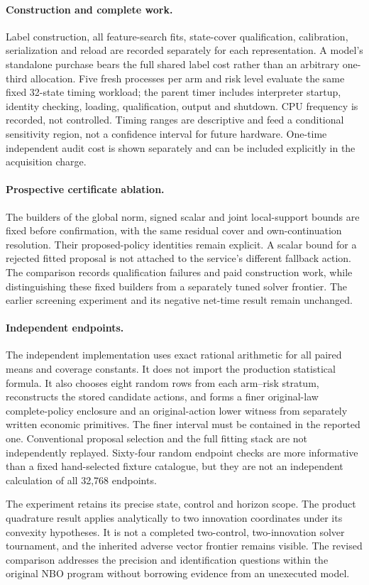 \paragraph{Construction and complete work.}
Label construction, all feature-search fits, state-cover qualification, calibration, serialization and reload are recorded separately for each representation. A model's standalone purchase bears the full shared label cost rather than an arbitrary one-third allocation. Five fresh processes per arm and risk level evaluate the same fixed 32-state timing workload; the parent timer includes interpreter startup, identity checking, loading, qualification, output and shutdown. CPU frequency is recorded, not controlled. Timing ranges are descriptive and feed a conditional sensitivity region, not a confidence interval for future hardware. One-time independent audit cost is shown separately and can be included explicitly in the acquisition charge.

\paragraph{Prospective certificate ablation.}
The builders of the global norm, signed scalar and joint local-support bounds are fixed before confirmation, with the same residual cover and own-continuation resolution. Their proposed-policy identities remain explicit. A scalar bound for a rejected fitted proposal is not attached to the service's different fallback action. The comparison records qualification failures and paid construction work, while distinguishing these fixed builders from a separately tuned solver frontier. The earlier screening experiment and its negative net-time result remain unchanged.

\paragraph{Independent endpoints.}
The independent implementation uses exact rational arithmetic for all paired means and coverage constants. It does not import the production statistical formula. It also chooses eight random rows from each arm--risk stratum, reconstructs the stored candidate actions, and forms a finer original-law complete-policy enclosure and an original-action lower witness from separately written economic primitives. The finer interval must be contained in the reported one. Conventional proposal selection and the full fitting stack are not independently replayed. Sixty-four random endpoint checks are more informative than a fixed hand-selected fixture catalogue, but they are not an independent calculation of all 32,768 endpoints.

The experiment retains its precise state, control and horizon scope. The product quadrature result applies analytically to two innovation coordinates under its convexity hypotheses. It is not a completed two-control, two-innovation solver tournament, and the inherited adverse vector frontier remains visible. The revised comparison addresses the precision and identification questions within the original NBO program without borrowing evidence from an unexecuted model.
